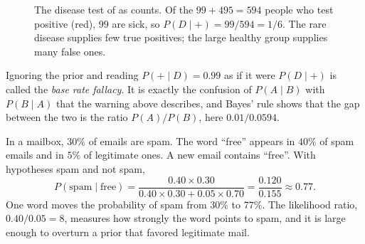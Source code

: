 \begin{figure}[ht]
  \centering
  \caption{The disease test of  as counts. Of the
    $99 + 495 = 594$ people who test positive (red), $99$ are sick, so
    $P(D \mid +) = 99/594 = 1/6$. The rare disease supplies few true
    positives; the large healthy group supplies many false ones.}
  \label{fig:ch05-bayes-tree}
\end{figure}

Ignoring the prior and reading $P(+ \mid D) = 0.99$ as if it were $P(D
\mid +)$ is called the \emph{base rate fallacy}. It is exactly the
confusion of $P(A \mid B)$ with $P(B \mid A)$ that the warning above
describes, and Bayes' rule shows that the gap between the two is the
ratio $P(A)/P(B)$, here $0.01/0.0594$.

\begin{example}
  \label{ex:ch05-spam}
  In a mailbox, $30\%$ of emails are spam. The word ``free'' appears in
  $40\%$ of spam emails and in $5\%$ of legitimate ones. A new email
  contains ``free''. With hypotheses spam and not spam,
  \[
    P(\text{spam} \mid \text{free})
    = \frac{0.40 \times 0.30}{0.40 \times 0.30 + 0.05 \times 0.70}
    = \frac{0.120}{0.155} \approx 0.77 .
  \]
  One word moves the probability of spam from $30\%$ to $77\%$. The
  likelihood ratio, $0.40/0.05 = 8$, measures how strongly the word
  points to spam, and it is large enough to overturn a prior that
  favored legitimate mail.
\end{example}

